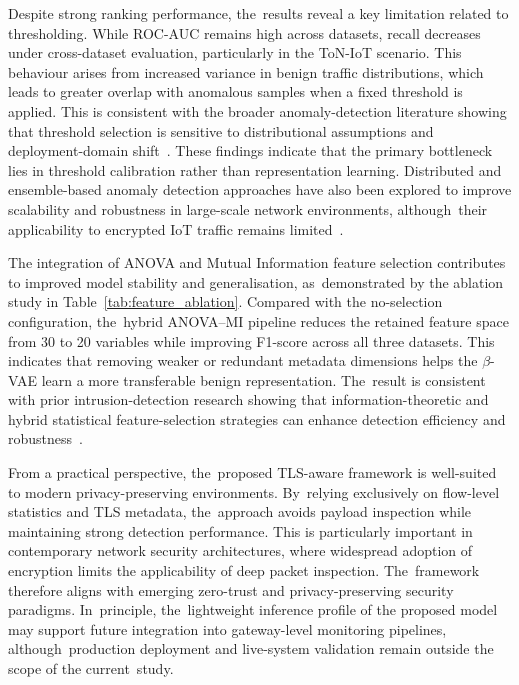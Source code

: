 \documentclass[futureinternet,article,accept,moreauthors]{Definitions/mdpi}
\begin{document}
Despite strong ranking performance, the~results reveal a key limitation related to thresholding. While ROC-AUC remains high across datasets, recall decreases under cross-dataset evaluation, particularly in the ToN-IoT scenario. This behaviour arises from increased variance in benign traffic distributions, which leads to greater overlap with anomalous samples when a fixed threshold is applied. This is consistent with the broader anomaly-detection literature showing that threshold selection is sensitive to distributional assumptions and deployment-domain shift~\cite{chandola2009,cantone2024}. These findings indicate that the primary bottleneck lies in threshold calibration rather than representation learning.
Distributed and ensemble-based anomaly detection approaches have also been explored to improve scalability and robustness in large-scale network environments, although~their applicability to encrypted IoT traffic remains limited~\cite{moustafa2021b}.

The integration of ANOVA and Mutual Information feature selection contributes to improved model stability and generalisation, as~demonstrated by the ablation study in Table~\ref{tab:feature_ablation}. Compared with the no-selection configuration, the~hybrid ANOVA--MI pipeline reduces the retained feature space from 30 to 20 variables while improving F1-score across all three datasets. This indicates that removing weaker or redundant metadata dimensions helps the $\beta$-VAE learn a more transferable benign representation. The~result is consistent with prior intrusion-detection research showing that information-theoretic and hybrid statistical feature-selection strategies can enhance detection efficiency and robustness~\cite{amiri2011,alsarem2022}.



From a practical perspective, the~proposed TLS-aware framework is well-suited to modern privacy-preserving environments. By~relying exclusively on flow-level statistics and TLS metadata, the~approach avoids payload inspection while maintaining strong detection performance. This is particularly important in contemporary network security architectures, where widespread adoption of encryption limits the applicability of deep packet inspection. The~framework therefore aligns with emerging zero-trust and privacy-preserving security paradigms. In~principle, the~lightweight inference profile of the proposed model may support future integration into gateway-level monitoring pipelines, although~production deployment and live-system validation remain outside the scope of the current~study.
\end{document}

